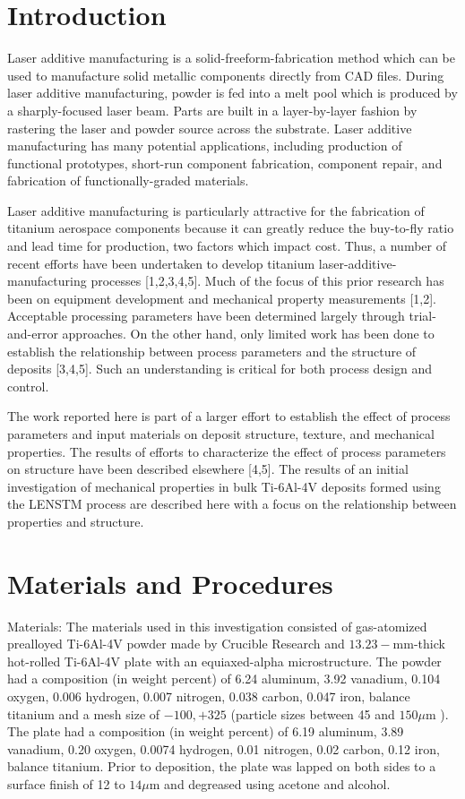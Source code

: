 \documentclass[10pt]{article}
\begin{document}
\section*{Introduction}
Laser additive manufacturing is a solid-freeform-fabrication method which can be used to manufacture solid metallic components directly from CAD files. During laser additive manufacturing, powder is fed into a melt pool which is produced by a sharply-focused laser beam. Parts are built in a layer-by-layer fashion by rastering the laser and powder source across the substrate. Laser additive manufacturing has many potential applications, including production of functional prototypes, short-run component fabrication, component repair, and fabrication of functionally-graded materials.

Laser additive manufacturing is particularly attractive for the fabrication of titanium aerospace components because it can greatly reduce the buy-to-fly ratio and lead time for production, two factors which impact cost. Thus, a number of recent efforts have been undertaken to develop titanium laser-additive-manufacturing processes [1,2,3,4,5]. Much of the focus of this prior research has been on equipment development and mechanical property measurements [1,2]. Acceptable processing parameters have been determined largely through trial-and-error approaches. On the other hand, only limited work has been done to establish the relationship between process parameters and the structure of deposits [3,4,5]. Such an understanding is critical for both process design and control.

The work reported here is part of a larger effort to establish the effect of process parameters and input materials on deposit structure, texture, and mechanical properties. The results of efforts to characterize the effect of process parameters on structure have been described elsewhere [4,5]. The results of an initial investigation of mechanical properties in bulk Ti-6Al-4V deposits formed using the LENSTM process are described here with a focus on the relationship between properties and structure.

\section*{Materials and Procedures}
Materials: The materials used in this investigation consisted of gas-atomized prealloyed Ti-6Al-4V powder made by Crucible Research and $13.23-\mathrm{mm}$-thick hot-rolled Ti-6Al-4V plate with an equiaxed-alpha microstructure. The powder had a composition (in weight percent) of 6.24 aluminum, 3.92 vanadium, 0.104 oxygen, 0.006 hydrogen, 0.007 nitrogen, 0.038 carbon, 0.047 iron, balance titanium and a mesh size of $-100,+325$ (particle sizes between 45 and $150 \mu \mathrm{m}$ ). The plate had a composition (in weight percent) of 6.19 aluminum, 3.89 vanadium, 0.20 oxygen, 0.0074 hydrogen, 0.01 nitrogen, 0.02 carbon, 0.12 iron, balance titanium. Prior to deposition, the plate was lapped on both sides to a surface finish of 12 to $14 \mu \mathrm{m}$ and degreased using acetone and alcohol.
\end{document}
